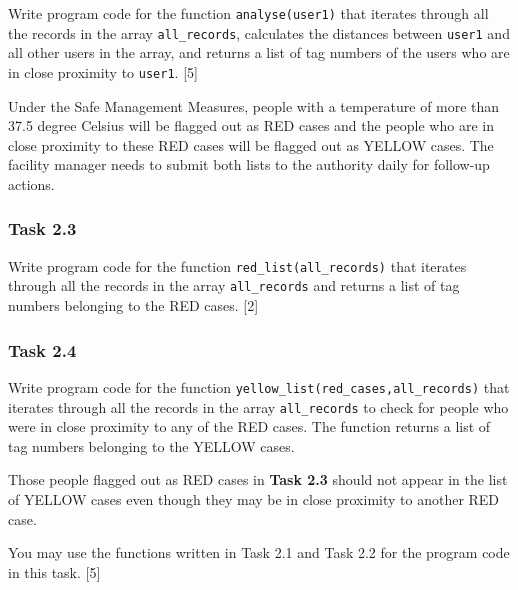 Write program code for the function \texttt{analyse(user1)} that iterates
through all the records in the array \texttt{all\_records}, calculates
the distances between \texttt{user1} and all other users in the array,
and returns a list of tag numbers of the users who are in close proximity
to \texttt{user1}. \hfill{} {[}5{]}

Under the Safe Management Measures, people with a temperature of more
than 37.5 degree Celsius will be flagged out as RED cases and the
people who are in close proximity to these RED cases will be flagged
out as YELLOW cases. The facility manager needs to submit both lists
to the authority daily for follow-up actions. 

\subsubsection*{Task 2.3 }

Write program code for the function \texttt{red\_list(all\_records)}
that iterates through all the records in the array \texttt{all\_records}
and returns a list of tag numbers belonging to the RED cases. \hfill{}
{[}2{]}

\subsubsection*{Task 2.4 }

Write program code for the function \texttt{yellow\_list(red\_cases,all\_records)}
that iterates through all the records in the array \texttt{all\_records}
to check for people who were in close proximity to any of the RED
cases. The function returns a list of tag numbers belonging to the
YELLOW cases. 

Those people flagged out as RED cases in \textbf{Task 2.3} should
not appear in the list of YELLOW cases even though they may be in
close proximity to another RED case. 

You may use the functions written in Task 2.1 and Task 2.2 for the
program code in this task. \hfill{} {[}5{]}